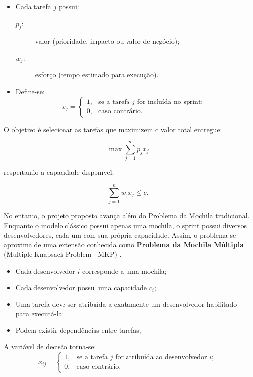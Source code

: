 \documentclass[12pt]{article}
\begin{document}
\begin{itemize}
    \item Cada tarefa $j$ possui:
    \begin{description}
        \item[$p_j$:] valor (prioridade, impacto ou valor de negócio);
        \item[$w_j$:] esforço (tempo estimado para execução).
    \end{description}

    \item Define-se:
    \[
    x_j =
    \begin{cases}
    1, & \text{se a tarefa } j \text{ for incluída no sprint;} \\
    0, & \text{caso contrário.}
    \end{cases}
    \]
\end{itemize}


O objetivo é selecionar as tarefas que maximizem o valor total entregue:

\[
\max \sum_{j=1}^{n} p_j x_j
\]

respeitando a capacidade disponível:

\[
\sum_{j=1}^{n} w_j x_j \leq c.
\]


No entanto, o projeto proposto avança além do Problema da Mochila tradicional. Enquanto o modelo clássico possui apenas uma mochila, o sprint possui diversos desenvolvedores, cada um com sua própria capacidade. Assim, o problema se aproxima de uma extensão conhecida como \textbf{Problema da Mochila Múltipla} (Multiple Knapsack Problem - MKP) \cite{martello1990knapsack, arenales2015pesquisa}.

\begin{itemize}
    \item Cada desenvolvedor $i$ corresponde a uma mochila;
    
    \item Cada desenvolvedor possui uma capacidade $c_i$;
    
    \item Uma tarefa deve ser atribuída a exatamente um desenvolvedor habilitado para executá-la;
    
    \item Podem existir dependências entre tarefas;

\end{itemize}

A variável de decisão torna-se:
\[
x_{ij} =
\begin{cases}
1, & \text{se a tarefa } j \text{ for atribuída ao desenvolvedor } i; \\
0, & \text{caso contrário.}
\end{cases}
\]
\end{document}
